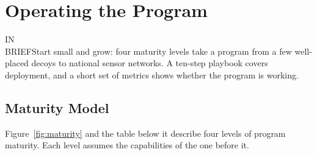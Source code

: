 \documentclass[11pt,letterpaper]{article}
\newcommand{\inbrief}[1]{\begin{inbriefbox}IN\\BRIEF\tcblower #1\end{inbriefbox}}
\begin{document}
\section{Operating the Program}
\label{sec:operating}

\inbrief{Start small and grow: four maturity levels take a program from a few well-placed decoys to national sensor networks. A ten-step playbook covers deployment, and a short set of metrics shows whether the program is working.}

\subsection{Maturity Model}
\label{sec:maturity}

Figure~\ref{fig:maturity} and the table below it describe four levels of program maturity. Each level assumes the capabilities of the one before it.
\end{document}
